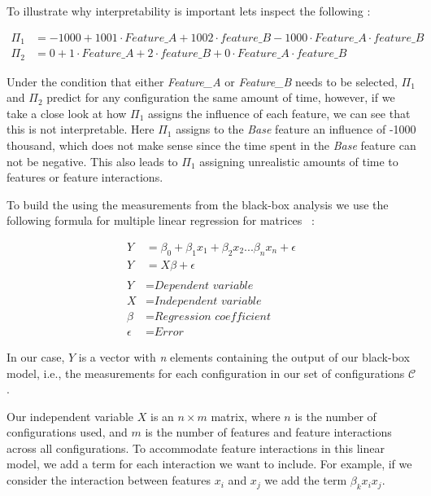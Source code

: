 To illustrate why interpretability is important lets inspect the following \perfInfluenceModel:

\begin{align*}
    \Pi_1 &= -1000 + 1001 \cdot \textit{Feature\_A} + 1002 \cdot \textit{feature\_B} - 1000 \cdot \textit{Feature\_A} \cdot \textit{feature\_B} \\
    \Pi_2 &= 0 + 1 \cdot \textit{Feature\_A} + 2 \cdot \textit{feature\_B} + 0 \cdot \textit{Feature\_A} \cdot \textit{feature\_B}
\end{align*}

Under the condition that either \textit{Feature\_A} or \textit{Feature\_B} needs to be selected, 
$\Pi_1$ and $\Pi_2$ predict for any configuration the same amount of time, however, 
if we take a close look at how $\Pi_1$ assigns the influence of each feature, we can see that this is not interpretable. 
Here $\Pi_1$ assigns to the \textit{Base} feature an influence of -1000 thousand, 
which does not make sense since the time spent in the \textit{Base} feature can not be negative. 
This also leads to $\Pi_1$ assigning unrealistic amounts of time to features or feature interactions. 

To build the {\perfInfluenceModel} using the measurements from the black-box analysis we use 
 the following formula for multiple linear regression for matrices ~\cite{Linear-Regression-Performance}:

\begin{align}\label{formula:linReg}
    Y &= \beta_0 + \beta_1 x_1 + \beta_2 x_2 ... \beta_n x_n + \epsilon   \\
    Y &= X \beta + \epsilon \nonumber\\ \nonumber \\ \nonumber
    Y &= \textit{Dependent variable}\\ \nonumber
    X &= \textit{Independent variable}\\ \nonumber
    \beta &= \textit{Regression coefficient}\\ \nonumber
    \epsilon &= \textit{Error} \nonumber
\end{align}

In our case, $Y$ is a vector with \textit{n}  elements containing the output of our black-box model,
i.e., the measurements for each configuration in our set of configurations $\mathcal{C}$. 

Our independent variable $X$ is an $n \times m$ matrix, where $n$ is the number of configurations used, 
and $m$ is the number of features and feature interactions across all configurations. 
To accommodate feature interactions in this linear model, we add a term for each interaction we want to include. 
For example, if we consider the interaction between features $x_i$ and $x_j$ we add the term $\beta_k x_i x_j$. 

